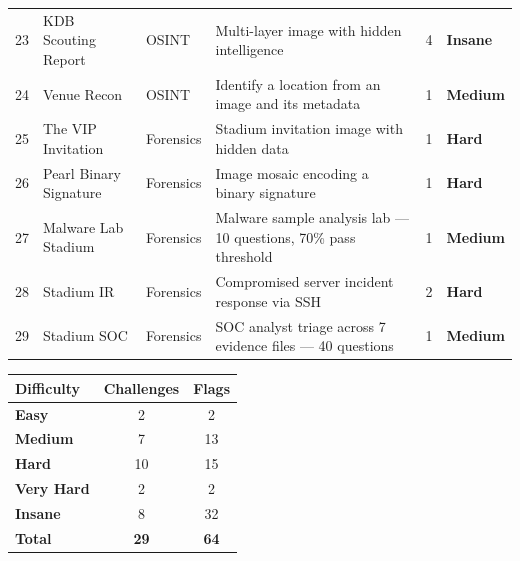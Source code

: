\documentclass[a4paper,10pt]{article}
\newcommand{\easy}{\textbf{Easy}}
\newcommand{\medium}{\textbf{Medium}}
\newcommand{\hard}{\textbf{Hard}}
\newcommand{\vhard}{\textbf{Very Hard}}
\newcommand{\insane}{\textbf{Insane}}
\begin{document}
\begin{longtable}{>{\raggedright}p{0.5cm} >{\raggedright}p{3.5cm} >{\raggedright}p{2.2cm} >{\raggedright}p{10cm} p{1.2cm} >{\raggedright\arraybackslash}p{1.8cm}}
23 & KDB Scouting Report     & OSINT      & Multi-layer image with hidden intelligence                                        & 4 & \insane \\
24 & Venue Recon             & OSINT      & Identify a location from an image and its metadata                               & 1 & \medium   \\

25 & The VIP Invitation      & Forensics  & Stadium invitation image with hidden data                                        & 1 & \hard     \\
26 & Pearl Binary Signature  & Forensics  & Image mosaic encoding a binary signature                                         & 1 & \hard     \\
27 & Malware Lab Stadium     & Forensics  & Malware sample analysis lab --- 10 questions, 70\% pass threshold                & 1 & \medium   \\
28 & Stadium IR              & Forensics  & Compromised server incident response via SSH                                     & 2 & \hard     \\
29 & Stadium SOC             & Forensics  & SOC analyst triage across 7 evidence files --- 40 questions                      & 1 & \medium   \\

\end{longtable}

\vspace{1cm}

\begin{center}
\renewcommand{\arraystretch}{1.4}
\begin{tabular}{lcc}
\toprule
\textbf{Difficulty} & \textbf{Challenges} & \textbf{Flags} \\
\midrule
\easy       & 2  & 2  \\
\medium     & 7  & 13 \\
\hard       & 10 & 15 \\
\vhard      & 2  & 2  \\
\insane     & 8  & 32 \\
\midrule
\textbf{Total} & \textbf{29} & \textbf{64} \\
\bottomrule
\end{tabular}
\end{center}
\end{document}
